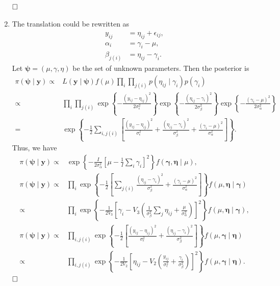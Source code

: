 \documentclass[11pt]{article}
\begin{document}
\begin{enumerate}
\begin{align*}
    \end{align*}
    $\hfill\square$
    \item The translation could be rewritten as
    \begin{align*}
        y_{ij}&=\eta_{ij}+\epsilon_{ij},\\
        \alpha_i&=\gamma_i-\mu,\\
        \beta_{j(i)}&=\eta_{ij}-\gamma_i.
    \end{align*}
    Let $\boldsymbol{\psi}=(\mu,\gamma,\eta)$ be the set of unknown parameters. Then the posterior is
    \begin{align*}
        \pi(\boldsymbol{\psi\mid \mathbf{y}})
        \propto& L(\mathbf{y}\mid\boldsymbol{\psi}) f(\mu) \prod_{i} \prod_{j(i)} p(\eta_{ij}\mid \gamma_i) p(\gamma_i)\\
        \propto&\prod_{i} \prod_{j(i)} \exp\left\{ -\frac{(y_{ij}-\eta_{ij})^2}{2 \sigma_\epsilon ^2} \right\}\exp\left\{ -\frac{(\eta_{ij}-\gamma_i)^2}{2\sigma_\beta^2} \right\} \exp\left\{ -\frac{(\gamma_i-\mu)^2}{2\sigma_\alpha^2} \right\} \\ 
        =&\exp\left\{ -\frac{1}{2}\sum\limits_{i,j(i)}\left[ \frac{(y_{ij}-\eta_{ij})^2}{\sigma_\epsilon ^2}+ \frac{(\eta_{ij}-\gamma_i)^2}{\sigma_\beta^2}+\frac{(\gamma_i-\mu)^2}{\sigma_\alpha^2} \right] \right\}.
    \end{align*}
    Thus, we have
    \begin{align*}
        \pi(\boldsymbol{\psi\mid \mathbf{y}})
        \propto&\exp\left\{ -\frac{I}{2\sigma_\alpha^2} \left[ \mu-\frac{1}{I} \sum_{i} \gamma_{i} \right]^2\right\} f(\boldsymbol{\gamma},\boldsymbol{\eta}\mid \mu),\\ 
        \pi(\boldsymbol{\psi\mid \mathbf{y}})
        \propto&\prod_i\exp\left\{ -\frac{1}{2} \left[ \sum\limits_{j(i)}\frac{(\eta_{ij}-\gamma_i)^2}{\sigma_\beta^2}+\frac{(\gamma_i-\mu)^2}{\sigma_\alpha^2} \right] \right\} f(\mu,\boldsymbol{\eta}\mid \boldsymbol{\gamma})\\
        \propto&\prod_i\exp\left\{ -\frac{1}{2V_3}\left[ \gamma_i- V_{3}\left(\frac{1}{\sigma_{\beta}^{2}} \sum_{j} \eta_{i j}+\frac{\mu}{\sigma_{\alpha}^{2}} \right) \right]^2 \right\}f(\mu,\boldsymbol{\eta}\mid \boldsymbol{\gamma}),\\
        \pi(\boldsymbol{\psi\mid \mathbf{y}})
        \propto&\prod_{i,j(i)}\exp\left\{ -\frac{1}{2} \left[ \frac{(y_{ij}-\eta_{ij})^2}{\sigma_\epsilon ^2}+ \frac{(\eta_{ij}-\gamma_i)^2}{\sigma_\beta^2} \right]\right\} f(\mu,\boldsymbol{\gamma}\mid \boldsymbol{\eta})\\ 
        \propto& \prod_{i,j(i)}\exp\left\{ -\frac{1}{2V_2} \left[\eta_{ij}-V_{2}\left(\frac{y_{i j}}{\sigma_{\epsilon}^{2}}+\frac{\gamma_{i}}{\sigma_{\beta}^{2}}\right)  \right]^2\right\}f(\mu,\boldsymbol{\gamma}\mid \boldsymbol{\eta}).
    \end{align*}
    $\hfill\square$
\end{enumerate}
\end{document}
